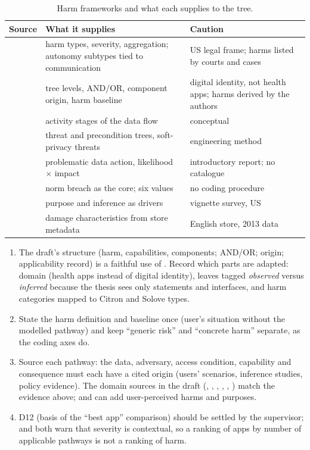 \begin{table}[t]
\centering\small
\caption{Harm frameworks and what each supplies to the tree.}
\label{tab:H-frameworks}
\begin{tabularx}{\textwidth}{@{}P{2.8cm}YY@{}}
\toprule
\textbf{Source} & \textbf{What it supplies} & \textbf{Caution}\\
\midrule
{} & harm types, severity, aggregation; autonomy subtypes tied to communication & US legal frame; harms listed by courts and cases\\
 & tree levels, AND/OR, component origin, harm baseline & digital identity, not health apps; harms derived by the authors\\
 & activity stages of the data flow & conceptual\\
 & threat and precondition trees, soft-privacy threats & engineering method\\
 & problematic data action, likelihood $\times$ impact & introductory report; no catalogue\\
 & norm breach as the core; six values & no coding procedure\\
 & purpose and inference as drivers & vignette survey, US\\
 & damage characteristics from store metadata & English store, 2013 data\\
\bottomrule
\end{tabularx}
\end{table}

\begin{thesisbox}
\begin{enumerate}[leftmargin=1.3em]
\item The draft's structure (harm, capabilities, components; AND/OR; origin; applicability record) is a faithful use of . Record which parts are adapted: domain (health apps instead of digital identity), leaves tagged \emph{observed} versus \emph{inferred} because the thesis sees only statements and interfaces, and harm categories mapped to Citron and Solove types.
\item State the harm definition and baseline once (user's situation without the modelled pathway) and keep ``generic risk'' and ``concrete harm'' separate, as the coding axes do.
\item Source each pathway: the data, adversary, access condition, capability and consequence must each have a cited origin (users' scenarios, inference studies, policy evidence). The domain sources in the draft (, , , , , ) match the evidence above;  and  can add user-perceived harms and purposes.
\item D12 (basis of the ``best app'' comparison) should be settled by the supervisor;  and  both warn that severity is contextual, so a ranking of apps by number of applicable pathways is not a ranking of harm.
\end{enumerate}
\end{thesisbox}
